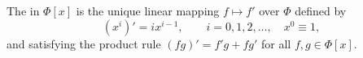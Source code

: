 The  in $\Phi[x]$ is the unique linear mapping $f \mapsto f'$ over $\Phi$ defined by
$$(x^i)' = i x^{i-1}, \qquad i = 0, 1, 2, \ldots, \quad x^0 \equiv 1,$$
and satisfying the product rule $(fg)' = f'g + fg'$ for all $f, g \in \Phi[x]$.
